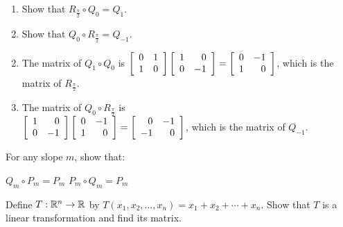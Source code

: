 \begin{multicols}{2}
\begin{ex}
\begin{enumerate}[label={\alph*.}]
\item Show that $R_{\frac{\pi}{2}} \circ Q_{0} = Q_{1}$.

\item Show that $Q_{0} \circ R_{\frac{\pi}{2}} = Q_{-1}$.

\end{enumerate}
\begin{sol}
\begin{enumerate}[label={\alph*.}]
\setcounter{enumi}{1}
\item  The matrix of $Q_{1} \circ Q_{0}$
 is $\left[ \begin{array}{rr}
 0 & 1 \\
 1 & 0
 \end{array} \right] \left[ \begin{array}{rr}
 1 & 0 \\
 0 & -1
 \end{array} \right] = \left[ \begin{array}{rr}
 0 & -1 \\
 1 & 0
 \end{array} \right]$,
 which is the matrix of $R_{\frac{\pi}{2}}$.

\setcounter{enumi}{3}
\item  The matrix of $Q_{0} \circ R_{\frac{\pi}{2}}$
 is \\ $\left[ \begin{array}{rr}
 1 & 0 \\
 0 & -1
 \end{array} \right] \left[ \begin{array}{rr}
 0 & -1 \\
 1 & 0
 \end{array} \right] = \left[ \begin{array}{rr}
 0 & -1 \\
 -1 & 0
 \end{array} \right]$,
 which is the matrix of $Q_{-1}$.

\end{enumerate}
\end{sol}
\end{ex}

\begin{ex}
For any slope $m$, show that:
\begin{exenumerate}
\exitem $Q_{m} \circ P_{m} = P_{m}$
\exitem $P_{m} \circ Q_{m} = P_{m}$
\end{exenumerate}
\end{ex}

\begin{ex}
Define $T : \mathbb{R}^n \to \mathbb{R}$ by $T(x_{1}, x_{2}, \dots, x_{n}) = x_{1} + x_{2} + \cdots + x_{n}$. Show that $T$ is a linear transformation and find its matrix.


\end{ex}
\end{multicols}
